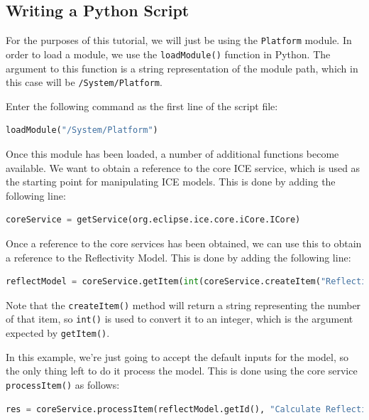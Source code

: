 \subsection{Writing a Python Script}

For the purposes of this tutorial, we will just be using the
\texttt{Platform} module. In order to load a module, we use the
\texttt{loadModule()} function in Python. The argument to this function is a
string representation of the module path, which in this case will be
\texttt{/System/Platform}. 

Enter the following command as the first line of the script file:

\lstset{basicstyle=\ttfamily\small, breaklines}

\begin{lstlisting}[frame=single,language=Python]
loadModule("/System/Platform")
\end{lstlisting}

Once this module has been loaded, a number of additional functions become
available. We want to obtain a reference to the core ICE service, which is used
as the starting point for manipulating ICE models. This is done by adding the
following line:

\begin{lstlisting}[frame=single,language=Python]
coreService = getService(org.eclipse.ice.core.iCore.ICore)
\end{lstlisting}

Once a reference to the core services has been obtained, we can use this to
obtain a reference to the Reflectivity Model. This is done by adding the
following line:

\begin{lstlisting}[frame=single,language=Python]
reflectModel = coreService.getItem(int(coreService.createItem("Reflectivity Model")))
\end{lstlisting}

Note that the \texttt{createItem()} method will return a string representing the
number of that item, so \texttt{int()} is used to convert it to an integer, which is the
argument expected by \texttt{getItem()}.

In this example, we're just going to accept the default inputs for the model, so
the only thing left to do it process the model. This is done using the core
service \texttt{processItem()} as follows:

\begin{lstlisting}[frame=single,language=Python]
res = coreService.processItem(reflectModel.getId(), "Calculate Reflectivity", 1)
\end{lstlisting}

